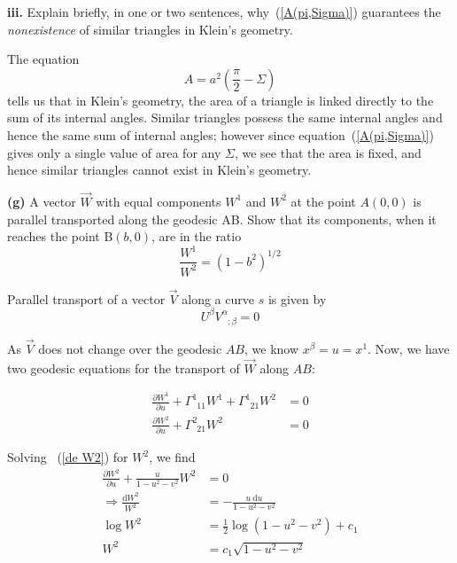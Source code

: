 \documentclass[a4paper]{article} %
\newcommand{\ph}[1]{\phantom{#1}}
\begin{document}
 
\pagebreak  %

\begin{framed}
\textbf{iii.} Explain briefly, in one or two sentences, why~(\ref{A(pi,Sigma)}) guarantees the \emph{nonexistence} of similar triangles in Klein’s geometry.
\end{framed}

The equation
\begin{equation*}
A=a^2\left(\frac{\pi}{2}-\Sigma\right)
\end{equation*}
tells us that in Klein's geometry, the area of a triangle is linked directly to the sum of its internal angles. Similar triangles possess the same internal angles and hence the same sum of internal angles; however since equation~(\ref{A(pi,Sigma)}) gives only a single value of area for any $\Sigma$, we see that the area is fixed, and hence similar triangles cannot exist in Klein's geometry.

\pagebreak  %

\begin{framed}
\textbf{(g)} A vector $\vec{W}$ with equal components $W^1$ and $W^2$ at the point $A(0,0)$ is parallel transported along the geodesic AB. Show that its components, when it reaches the point B$(b,0)$, are in the ratio
\begin{equation}
\frac{W^1}{W^2}=(1-b^2)^{1/2}
\end{equation}
\end{framed}

Parallel transport of a vector $\vec{V}$ along a curve $s$ is given by
\begin{equation}
U^{\beta}V^{\alpha}_{\ph{\alpha};\beta}=0
\end{equation}

As $\vec{V}$ does not change over the geodesic $AB$, we know $x^{\beta}=u=x^{1}$. Now, we have two geodesic equations for the transport of $\vec{W}$ along $AB$:

\begin{align}
\frac{\partial W^{1}}{\partial u}+\Gamma^{1}_{\ph{1}11}W^{1}
+\Gamma^{1}_{\ph{1}21}W^2&=0 \label{W1 diff eqn}\\
\frac{\partial W^{2}}{\partial u}+\Gamma^{2}_{\ph{2}21}W^2&=0\label{de W2}
\end{align}

Solving ~(\ref{de W2}) for $W^2$, we find
\begin{align}
\frac{\partial W^2}{\partial u}+\frac{u}{1-u^2-v^2}W^2&=0\\
\Rightarrow \frac{\text{d}W^2}{W^2}&=-\frac{u~\text{d}u}{1-u^2-v^2}\\
\log W^2&=\frac{1}{2}\log(1-u^2-v^2)+c_{1}\\
W^2&=c_1\sqrt{1-u^2-v^2}\label{W2 eqn}
\end{align}
\end{document}
